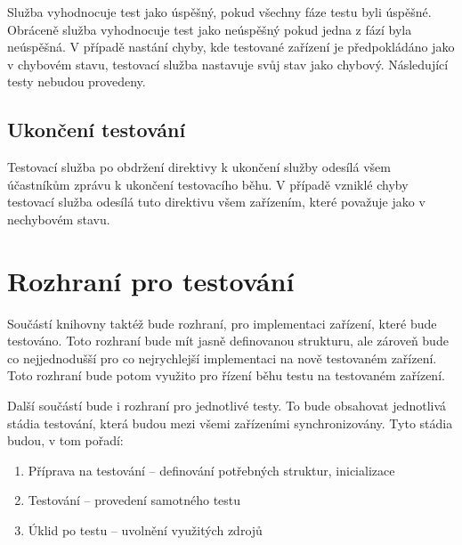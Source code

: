 Služba vyhodnocuje test jako úspěšný, pokud všechny fáze testu byli úspěšné. Obráceně služba vyhodnocuje test jako neúspěšný pokud jedna z fází byla neúspěšná. V případě nastání chyby, kde testované zařízení je předpokládáno jako v chybovém stavu, testovací služba nastavuje svůj stav jako chybový. Následující testy nebudou provedeny.


\subsection{Ukončení testování}
Testovací služba po obdržení direktivy k ukončení služby odesílá všem účastníkům zprávu k ukončení testovacího běhu. V případě vzniklé chyby testovací služba odesílá tuto direktivu všem zařízením, které považuje jako v nechybovém stavu.


\section{Rozhraní pro testování}
Součástí knihovny taktéž bude rozhraní, pro implementaci zařízení, které bude testováno. Toto rozhraní bude mít jasně definovanou  strukturu, ale zároveň bude co nejjednodušší pro co nejrychlejší implementaci na nově testovaném zařízení. Toto rozhraní bude potom využito pro řízení běhu testu na testovaném zařízení. 

Další součástí bude i rozhraní pro jednotlivé testy. To bude obsahovat jednotlivá stádia testování, která budou mezi všemi zařízeními synchronizovány. Tyto stádia budou, v tom pořadí:
\begin{enumerate}
    \item Příprava na testování -- definování potřebných struktur, inicializace
    \item Testování -- provedení samotného testu
    \item Úklid po testu -- uvolnění využitých zdrojů
\end{enumerate}






